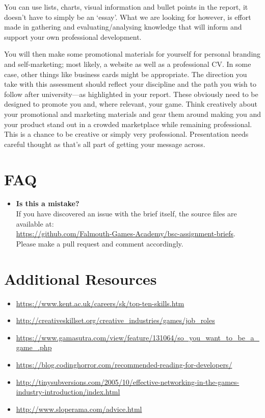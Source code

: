 \documentclass{../../fal_assignment}
\begin{document}
You can use lists, charts, visual information and bullet points in the report, it doesn't have to simply be an `essay'. What we are looking for however, is effort made in gathering and evaluating/analysing knowledge that will inform and support your own professional development.

You will then make some promotional materials for yourself for personal branding and self-marketing; most likely, a website as well as a professional CV. In some case, other things like business cards might be appropriate. The direction you take with this assessment should reflect your discipline and the path you wish to follow after university---as highlighted in your report. These obviously need to be designed to promote you and, where relevant, your game. Think creatively about your promotional and marketing materials and gear them around making you and your product stand out in a crowded marketplace while remaining professional. This is a chance to be creative or simply very professional. Presentation needs careful thought as that’s all part of getting your message across.
 
\section*{FAQ}

\begin{itemize}  		
    	\item 	\textbf{Is this a mistake?} \\ 	
    		If you have discovered an issue with the brief itself, the source files are available at: \\
    		\url{https://github.com/Falmouth-Games-Academy/bsc-assignment-briefs}.\\
    		 Please make a pull request and comment accordingly.
\end{itemize}

\section*{Additional Resources}

\begin{itemize}
    \item \url{https://www.kent.ac.uk/careers/sk/top-ten-skills.htm}
    \item \url{http://creativeskillset.org/creative_industries/games/job_roles}
    \item \url{https://www.gamasutra.com/view/feature/131064/so_you_want_to_be_a_game_.php}
    \item \url{https://blog.codinghorror.com/recommended-reading-for-developers/}
    \item \url{http://tinysubversions.com/2005/10/effective-networking-in-the-games-industry-introduction/index.html}
    \item \url{http://www.sloperama.com/advice.html}
\end{itemize}
\end{document}
